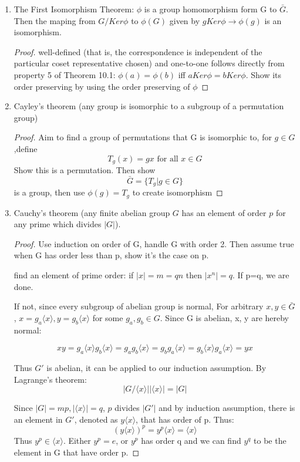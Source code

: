 \documentclass[11pt, oneside]{article}
\begin{document}
\begin{enumerate}
\begin{enumerate}
\item The First Isomorphism Theorem: $\phi$ is a group homomorphism form G to $\bar{G}$. Then the maping from $G/Ker\phi$ to $\phi(G)$ given by $gKer\phi \longrightarrow \phi(g)$ is an isomorphism. 
\begin{proof}
well-defined (that is, the correspondence is independent of the particular coset representative chosen) and one-to-one follows directly from property 5 of Theorem 10.1: $\phi(a)=\phi(b)$ iff $aKer\phi=bKer\phi$. Show its order preserving by using the order preserving of $\phi$
\end{proof}
\item Cayley's theorem (any group is isomorphic to a subgroup of a permutation group)
\begin{proof}
Aim to find a group of permutations that G is isomorphic to, for $g\in G$,define 
\[T_g(x)=gx \text{ for all }  x \in G\]
Show this is a permutation. Then show
\[\bar{G}=\{T_g|g\in G\}\]
is a group, then use $\phi(g)=T_g$ to create isomorphism 
\end{proof}


\item Cauchy's theorem (any finite abelian group $G$ has an element of order $p$ for any prime which divides $|G|$).
\begin{proof}
Use induction on order of G, handle G with order 2. Then assume true when G has order less than p, show it's the case on p.

find an element of prime order: if $|x|=m=qn$ then $|x^n|=q$. If p=q, we are done. 

If not, since every subgroup of abelian group is normal, For arbitrary $x,y \in \bar{G}$, $x=g_a\langle x\rangle, y=g_b\langle x\rangle$ for some $g_a, g_b\in G$. Since G is abelian, x, y are hereby normal:

\[xy= g_a\langle x\rangle g_b\langle x\rangle=g_a g_b\langle x\rangle= g_bg_a\langle x\rangle =g_b\langle x\rangle g_a\langle x\rangle=yx\]

Thus $G'$ is abelian, it can be applied to our induction assumption. By Lagrange's theorem:
\[|G/\langle x\rangle||\langle x\rangle|=|G|\]

Since $|G|=mp, |\langle x\rangle|=q$, $p$ divides $|G'|$ and by induction assumption, there is an element in $G'$, denoted as $y\langle x\rangle$, that has order of p. Thus:
\[(y\langle x\rangle)^p=y^p\langle x\rangle=\langle x\rangle\]
Thus $y^p\in\langle x\rangle$. Either $y^p=e$, or $y^p$ has order q and we can find $y^q$ to be the element in G that have order p.
\end{proof}



\end{enumerate}
\end{enumerate}
\end{document}
